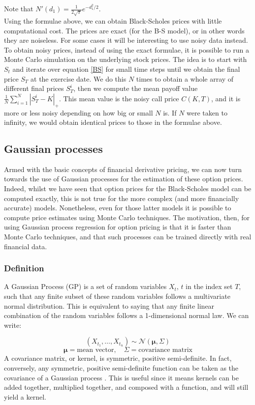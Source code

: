 \documentclass[a4paper,12pt]{article}
\begin{document}
Note that $N'(d_1) = \frac{1}{2\sqrt{\pi}} e^{-d_1^2/2}$.\\
Using the formulae above, we can obtain Black-Scholes prices with little computational cost. The prices are exact (for the B-S model), or in other words they are noiseless. For some cases it will be interesting to use noisy data instead. To obtain noisy prices, instead of using the exact formulae, it is possible to run a Monte Carlo simulation on the underlying stock prices. The idea is to start with $S_t$ and iterate over equation \ref{BS} for small time steps until we obtain the final price $S_T$ at the exercise date. We do this $N$ times to obtain a whole array of different final prices $S^i_T$, then we compute the mean payoff value $\frac{1}{N} \sum_{i = 1}^N |S^i_T - K|_+$. This mean value is the noisy call price $C(K, T)$, and it is more or less noisy depending on how big or small $N$ is. If $N$ were taken to infinity, we would obtain identical prices to those in the formulae above.

\subsection{Gaussian processes}
Armed with the basic concepts of financial derivative pricing, we can now turn towards the use of Gaussian processes for the estimation of these option prices. Indeed, whilst we have seen that option prices for the Black-Scholes model can be computed exactly, this is not true for the more complex (and more financially accurate) models. Nonetheless, even for those latter models it is possible to compute price estimates using Monte Carlo techniques. The motivation, then, for using Gaussian process regression for option pricing is that it is faster than Monte Carlo techniques, and that such processes can be trained directly with real financial data.
\subsubsection{Definition}
A Gaussian Process (GP) is a set of random variables ${X_t}$, $t$ in the index set $T$, such that any finite subset of these random variables follows a multivariate normal distribution. This is equivalent to saying that any finite linear combination of the random variables follows a 1-dimensional normal law. We can write:

$$(X_{t_1},\dots,X_{t_n}) \sim \mathcal{N}(\boldsymbol{\mu},\Sigma)$$
$$\boldsymbol{\mu} = \text{mean vector}, \quad \Sigma = \text{covariance matrix}$$
A covariance matrix, or kernel, is symmetric, positive semi-definite. In fact, conversely, any symmetric, positive semi-definite function can be taken as the covariance of a Gaussian process \cite{durrande}. This is useful since it means kernels can be added together, multiplied together, and composed with a function, and will still yield a kernel.
\end{document}
